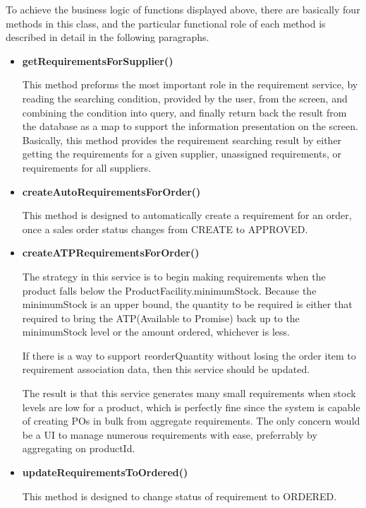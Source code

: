 \documentclass[a4paper,11pt]{article}
\begin{document}
	To achieve the business logic of functions displayed above, there are basically four methods in this class, and the particular functional role of each method is described in detail in the following paragraphs.
	\begin{itemize}
		\item \textbf{getRequirementsForSupplier()}
		
		This method preforms the most important role in the requirement service, by reading the searching condition, provided by the user, from the screen, and combining the condition into query, and finally return back the result from the database as a map to support the information presentation on the screen. Basically, this method provides the requirement searching result by either getting the requirements for a given supplier, unassigned requirements, or requirements for all suppliers.
		
		\item \textbf{createAutoRequirementsForOrder()}
		
		This method is designed to automatically create a requirement for an order, once a sales order status changes from CREATE to APPROVED.
		\item \textbf{createATPRequirementsForOrder()}
		
		The strategy in this service is to begin making requirements when the product falls below the ProductFacility.minimumStock.  Because the minimumStock is an upper bound, the quantity to be required is either that required to bring the ATP(Available to Promise) back up to the minimumStock level or the amount ordered, whichever is less.
         
         If there is a way to support reorderQuantity without losing the order item to requirement association data, then this service should be updated.
    
         The result is that this service generates many small requirements when stock levels are low for a product, which is perfectly fine since the system is capable of creating POs in bulk from aggregate requirements.
         The only concern would be a UI to manage numerous requirements with ease, preferrably by aggregating on productId.
		\item \textbf{updateRequirementsToOrdered()}
		
		This method is designed to change status of requirement to ORDERED. 
	\end{itemize}
\end{document}
